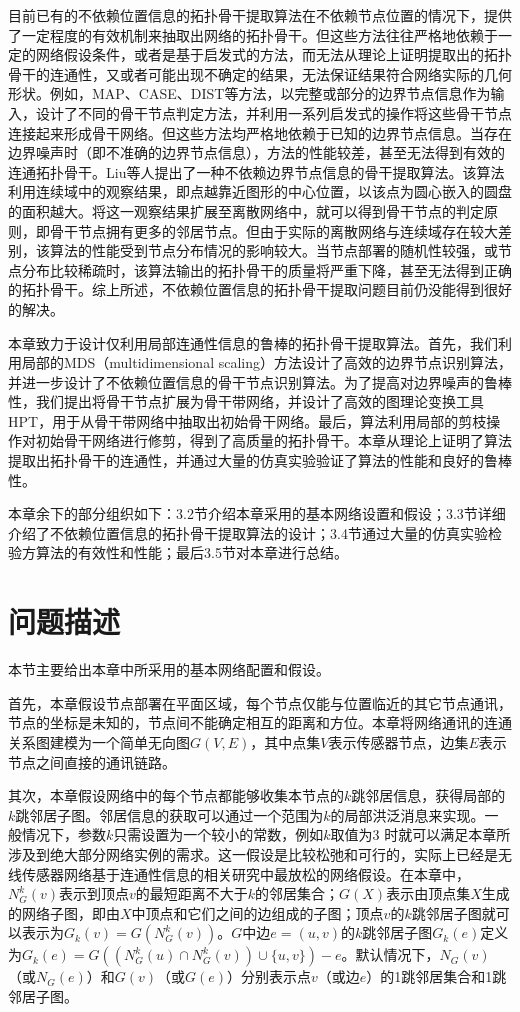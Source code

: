 目前已有的不依赖位置信息的拓扑骨干提取算法在不依赖节点位置的情况下，提供了一定程度的有效机制来抽取出网络的拓扑骨干。但这些方法往往严格地依赖于一定的网络假设条件，或者是基于启发式的方法，而无法从理论上证明提取出的拓扑骨干的连通性，又或者可能出现不确定的结果，无法保证结果符合网络实际的几何形状。例如，MAP、CASE、DIST等方法，以完整或部分的边界节点信息作为输入，设计了不同的骨干节点判定方法，并利用一系列启发式的操作将这些骨干节点连接起来形成骨干网络。但这些方法均严格地依赖于已知的边界节点信息。当存在边界噪声时（即不准确的边界节点信息），方法的性能较差，甚至无法得到有效的连通拓扑骨干。Liu等人提出了一种不依赖边界节点信息的骨干提取算法。该算法利用连续域中的观察结果，即点越靠近图形的中心位置，以该点为圆心嵌入的圆盘的面积越大。将这一观察结果扩展至离散网络中，就可以得到骨干节点的判定原则，即骨干节点拥有更多的邻居节点。但由于实际的离散网络与连续域存在较大差别，该算法的性能受到节点分布情况的影响较大。当节点部署的随机性较强，或节点分布比较稀疏时，该算法输出的拓扑骨干的质量将严重下降，甚至无法得到正确的拓扑骨干。综上所述，不依赖位置信息的拓扑骨干提取问题目前仍没能得到很好的解决。

本章致力于设计仅利用局部连通性信息的鲁棒的拓扑骨干提取算法。首先，我们利用局部的MDS（multidimensional scaling）方法设计了高效的边界节点识别算法，并进一步设计了不依赖位置信息的骨干节点识别算法。为了提高对边界噪声的鲁棒性，我们提出将骨干节点扩展为骨干带网络，并设计了高效的图理论变换工具HPT，用于从骨干带网络中抽取出初始骨干网络。最后，算法利用局部的剪枝操作对初始骨干网络进行修剪，得到了高质量的拓扑骨干。本章从理论上证明了算法提取出拓扑骨干的连通性，并通过大量的仿真实验验证了算法的性能和良好的鲁棒性。

本章余下的部分组织如下：3.2节介绍本章采用的基本网络设置和假设；3.3节详细介绍了不依赖位置信息的拓扑骨干提取算法的设计；3.4节通过大量的仿真实验检验方算法的有效性和性能；最后3.5节对本章进行总结。
\section{问题描述}
本节主要给出本章中所采用的基本网络配置和假设。

首先，本章假设节点部署在平面区域，每个节点仅能与位置临近的其它节点通讯，节点的坐标是未知的，节点间不能确定相互的距离和方位。本章将网络通讯的连通关系图建模为一个简单无向图$G(V,E)$，其中点集$V$表示传感器节点，边集$E$表示节点之间直接的通讯链路。

其次，本章假设网络中的每个节点都能够收集本节点的$k$跳邻居信息，获得局部的$k$跳邻居子图。邻居信息的获取可以通过一个范围为$k$的局部洪泛消息来实现。一般情况下，参数$k$只需设置为一个较小的常数，例如$k$取值为3 时就可以满足本章所涉及到绝大部分网络实例的需求。这一假设是比较松弛和可行的，实际上已经是无线传感器网络基于连通性信息的相关研究中最放松的网络假设。在本章中，$N_G^k(v)$表示到顶点$v$的最短距离不大于$k$的邻居集合；$G(X)$表示由顶点集$X$生成的网络子图，即由$X$中顶点和它们之间的边组成的子图；顶点$v$的$k$跳邻居子图就可以表示为$G_k(v)=G(N_G^k(v))$。$G$中边$e=(u,v)$的$k$跳邻居子图$G_k(e)$定义为$G_k(e)=G((N_G^k(u)\cap{N_G^k(v)})\cup\{u,v\})-e$。默认情况下，$N_G(v)$（或$N_G(e)$）和$G(v)$（或$G(e)$）分别表示点$v$（或边$e$）的1跳邻居集合和1跳邻居子图。
